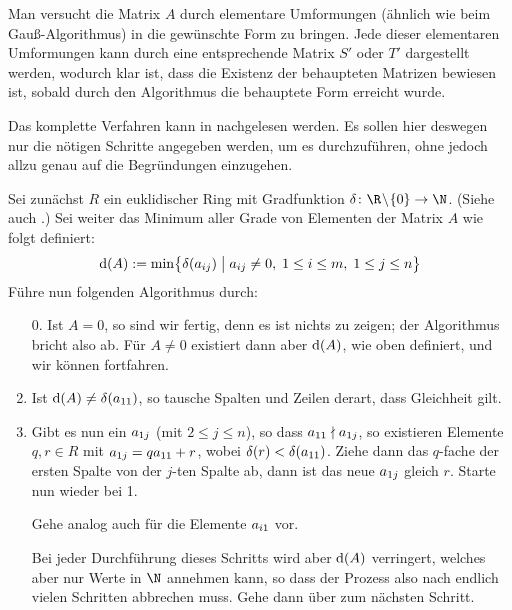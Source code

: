 \begin{proofsketch}
    Man versucht die Matrix $A$ durch elementare Umformungen (ähnlich wie beim
    Gauß-Algorithmus) in die gewünschte Form zu bringen. Jede dieser elementaren
    Umformungen kann durch eine entsprechende Matrix $S'$ oder $T'$ dargestellt
    werden, wodurch klar ist, dass die Existenz der behaupteten Matrizen
    bewiesen ist, sobald durch den Algorithmus die behauptete Form erreicht
    wurde.
    
    Das komplette Verfahren kann in \cite[S.\,211, Lemma~5]{bookc:bosch08}
    nachgelesen werden. Es sollen hier deswegen nur die nötigen Schritte
    angegeben werden, um es durchzuführen, ohne jedoch allzu genau auf die
    Begründungen einzugehen.
    
    Sei zunächst $R$ ein euklidischer Ring mit Gradfunktion
    $\delta\colon\R\!\setminus\!\{0\}\to\N$. 
    (Siehe auch \cite[??]{talk:rief}.) %
    Sei weiter das Minimum aller Grade von Elementen der Matrix $A$ wie folgt
    definiert:
    \[ \mathrm{d}(A) := \min\bigl\{ \delta(a_{ij}) \;\big\vert\; a_{ij}\neq0,\;
                            1\leq i\leq m, \; 1\leq j\leq n \bigr\}    \]
    Führe nun folgenden Algorithmus durch:
    \begin{enumerate}[1.]
        \item[0.]
            Ist $A=0$, so sind wir fertig, denn es ist nichts zu zeigen;
            der Algorithmus bricht also ab.
            Für $A\neq0$ existiert dann aber $\mathrm{d}(A)$, wie oben definiert, und
            wir können fortfahren.
            
        \item 
            Ist $\mathrm{d}(A) \neq \delta(a_{11})$, so tausche Spalten und Zeilen
            derart, dass Gleichheit gilt.
            
        \item
            Gibt es nun ein $a_{1j}$ (mit $2\leq j\leq n$), so dass 
            $a_{11} \nmid a_{1j}$, so existieren Elemente $q,r\in R$ mit $a_{1j} =
            qa_{11} + r$, wobei $\delta(r) < \delta(a_{11})$. Ziehe dann das
            $q$-fache der ersten Spalte von der $j$-ten Spalte ab, dann ist das
            neue $a_{1j}$ gleich $r$. Starte nun wieder bei 1.
            
            Gehe analog auch für die Elemente $a_{i1}$ vor.
            
            Bei jeder Durchführung dieses Schritts wird aber $\mathrm{d}(A)$ verringert,
            welches aber nur Werte in $\N$ annehmen kann, so dass der Prozess
            also nach endlich vielen Schritten abbrechen muss. Gehe dann über
            zum nächsten Schritt.
            

\end{enumerate}
\end{proofsketch}
